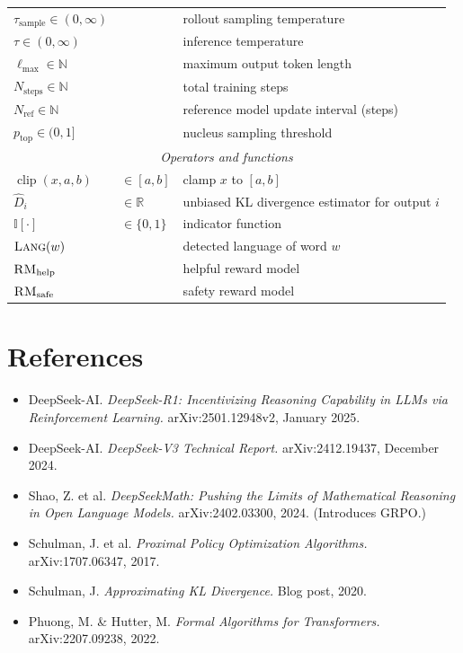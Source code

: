 \documentclass[11pt,a4paper]{article}
\newcommand{\R}{\mathbb{R}}
\newcommand{\N}{\mathbb{N}}
\DeclareMathOperator{\clip}{clip}
\begin{document}
\begin{longtable}{lll}
$\tau_{\mathrm{sample}} \in (0, \infty)$ & & rollout sampling temperature \\
$\tau \in (0, \infty)$ & & inference temperature \\
$\ell_{\max} \in \N$ & & maximum output token length \\
$N_{\mathrm{steps}} \in \N$ & & total training steps \\
$N_{\mathrm{ref}} \in \N$ & & reference model update interval (steps) \\
$p_{\mathrm{top}} \in (0, 1]$ & & nucleus sampling threshold \\
\midrule
\multicolumn{3}{c}{\textit{Operators and functions}} \\
\midrule
$\clip(x, a, b)$ & $\in [a, b]$ & clamp $x$ to $[a, b]$ \\
$\hat{D}_i$ & $\in \R$ & unbiased KL divergence estimator for output $i$ \\
$\mathbb{I}[\cdot]$ & $\in \{0, 1\}$ & indicator function \\
$\textsc{Lang}(w)$ & & detected language of word $w$ \\
$\textsc{RM}_{\mathrm{help}}$ & & helpful reward model \\
$\textsc{RM}_{\mathrm{safe}}$ & & safety reward model \\
\bottomrule
\end{longtable}

\section*{References}

\begin{itemize}
\item DeepSeek-AI. \textit{DeepSeek-R1: Incentivizing Reasoning Capability in LLMs via Reinforcement Learning.} arXiv:2501.12948v2, January 2025.
\item DeepSeek-AI. \textit{DeepSeek-V3 Technical Report.} arXiv:2412.19437, December 2024.
\item Shao, Z. et al. \textit{DeepSeekMath: Pushing the Limits of Mathematical Reasoning in Open Language Models.} arXiv:2402.03300, 2024. (Introduces GRPO.)
\item Schulman, J. et al. \textit{Proximal Policy Optimization Algorithms.} arXiv:1707.06347, 2017.
\item Schulman, J. \textit{Approximating KL Divergence.} Blog post, 2020.
\item Phuong, M. \& Hutter, M. \textit{Formal Algorithms for Transformers.} arXiv:2207.09238, 2022.
\end{itemize}
\end{document}
